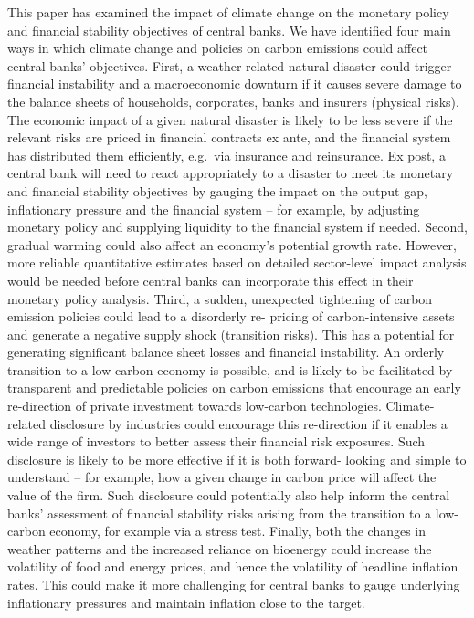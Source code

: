 \documentclass[
]{book}
\begin{document}
This paper has examined the impact of climate change on the monetary policy and financial
stability objectives of central banks. We have identified four main ways in which climate
change and policies on carbon emissions could affect central banks' objectives.
First, a weather-related natural disaster could trigger financial instability and a macroeconomic
downturn if it causes severe damage to the balance sheets of households, corporates, banks and
insurers (physical risks). The economic impact of a given natural disaster is likely to be less
severe if the relevant risks are priced in financial contracts ex ante, and the financial system has
distributed them efficiently, e.g.~via insurance and reinsurance. Ex post, a central bank will need
to react appropriately to a disaster to meet its monetary and financial stability objectives by
gauging the impact on the output gap, inflationary pressure and the financial system -- for
example, by adjusting monetary policy and supplying liquidity to the financial system if needed.
Second, gradual warming could also affect an economy's potential growth rate. However, more
reliable quantitative estimates based on detailed sector-level impact analysis would be needed
before central banks can incorporate this effect in their monetary policy analysis.
Third, a sudden, unexpected tightening of carbon emission policies could lead to a disorderly re-
pricing of carbon-intensive assets and generate a negative supply shock (transition risks). This
has a potential for generating significant balance sheet losses and financial instability. An
orderly transition to a low-carbon economy is possible, and is likely to be facilitated by
transparent and predictable policies on carbon emissions that encourage an early re-direction of
private investment towards low-carbon technologies. Climate-related disclosure by industries
could encourage this re-direction if it enables a wide range of investors to better assess their
financial risk exposures. Such disclosure is likely to be more effective if it is both forward-
looking and simple to understand -- for example, how a given change in carbon price will affect
the value of the firm. Such disclosure could potentially also help inform the central banks'
assessment of financial stability risks arising from the transition to a low-carbon economy, for
example via a stress test.
Finally, both the changes in weather patterns and the increased reliance on bioenergy could
increase the volatility of food and energy prices, and hence the volatility of headline inflation
rates. This could make it more challenging for central banks to gauge underlying inflationary
pressures and maintain inflation close to the target.
\end{document}
